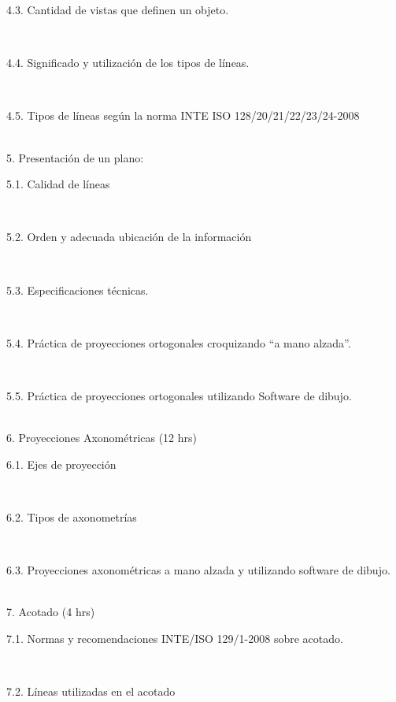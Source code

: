 \documentclass[letterpaper]{article}%
\begin{document}
\hspace*{0.02\linewidth}\parbox{0.98\linewidth}{\strut 4.3. Cantidad de vistas que definen un objeto.\strut}\\
\hspace*{0.02\linewidth}\parbox{0.98\linewidth}{\strut 4.4. Significado y utilización de los tipos de líneas.\strut}\\
\hspace*{0.02\linewidth}\parbox{0.98\linewidth}{\strut 4.5. Tipos de líneas según la norma INTE ISO 128/20/21/22/23/24-2008\strut}\\
5. Presentación de un plano:\\
\hspace*{0.02\linewidth}\parbox{0.98\linewidth}{\strut 5.1. Calidad de líneas\strut}\\
\hspace*{0.02\linewidth}\parbox{0.98\linewidth}{\strut 5.2. Orden y adecuada ubicación de la información\strut}\\
\hspace*{0.02\linewidth}\parbox{0.98\linewidth}{\strut 5.3. Especificaciones técnicas.\strut}\\
\hspace*{0.02\linewidth}\parbox{0.98\linewidth}{\strut 5.4. Práctica de proyecciones ortogonales croquizando “a mano alzada”.\strut}\\
\hspace*{0.02\linewidth}\parbox{0.98\linewidth}{\strut 5.5. Práctica de proyecciones ortogonales utilizando Software de dibujo.\strut}\\
6. Proyecciones Axonométricas (12 hrs)\\
\hspace*{0.02\linewidth}\parbox{0.98\linewidth}{\strut 6.1. Ejes de proyección\strut}\\
\hspace*{0.02\linewidth}\parbox{0.98\linewidth}{\strut 6.2. Tipos de axonometrías\strut}\\
\hspace*{0.02\linewidth}\parbox{0.98\linewidth}{\strut 6.3. Proyecciones axonométricas a mano alzada y utilizando software de dibujo.\strut}\\
7. Acotado (4 hrs) \\
\hspace*{0.02\linewidth}\parbox{0.98\linewidth}{\strut 7.1. Normas y recomendaciones INTE/ISO 129/1-2008 sobre acotado.\strut}\\
\hspace*{0.02\linewidth}\parbox{0.98\linewidth}{\strut 7.2. Líneas utilizadas en el acotado\strut}\\
\end{document}
